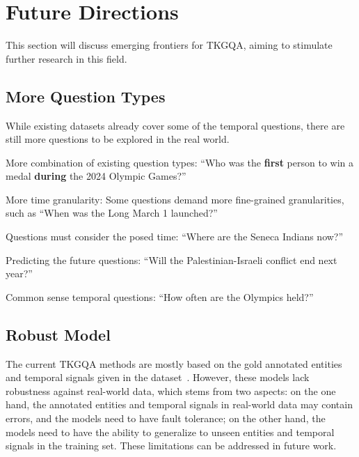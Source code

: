 \section{Future Directions\label{future}}
This section will discuss emerging frontiers for TKGQA,  aiming to stimulate further research in this field.

\subsection{More Question Types}
While existing datasets already cover some of the temporal questions, there are still more questions to be explored in the real world. 
\begin{inparaenum}[(i)]
\item  More combination of existing question types: ``Who was the \textbf{first} person to win a medal \textbf{during} the 2024 Olympic Games?'' 
\item More time granularity: Some questions demand more fine-grained granularities, such as ``When was the Long March 1 launched?'' 
\item Questions must consider the posed time: ``Where are the Seneca Indians now?''~\cite{jiaComplexTemporalQuestion2021,liskaStreamingQABenchmarkAdaptation2022a} 
\item  Predicting the future questions: ``Will the Palestinian-Israeli conflict end next year?''~\cite{jinForecastQAQuestionAnswering2021, dingForecastingQuestionAnswering2022, dingForecastTKGQuestionsBenchmarkTemporal2022} \item Common sense temporal questions: ``How often are the Olympics held?''
\end{inparaenum}

\subsection{Robust Model}
The current TKGQA methods are mostly based on the gold annotated entities and temporal signals given in the dataset~\cite{saxenaQuestionAnsweringTemporal2021,jiaComplexTemporalQuestion2021, neelamBenchmarkGeneralizableInterpretable2022}. However, these models lack robustness against real-world data, which stems from two aspects: on the one hand, the annotated entities and temporal signals in real-world data may contain errors, and the models need to have fault tolerance; on the other hand, the models need to have the ability to generalize to unseen entities and temporal signals in the training set. These limitations can be addressed in future work.

